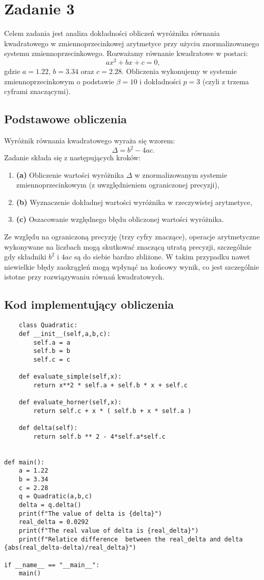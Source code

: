 \documentclass{article}
\begin{document}
\section{Zadanie 3}

Celem zadania jest analiza dokładności obliczeń wyróżnika równania kwadratowego w zmiennoprzecinkowej arytmetyce przy użyciu znormalizowanego systemu zmiennoprzecinkowego. Rozważamy równanie kwadratowe w postaci:
\[
ax^2 + bx + c = 0,
\]
gdzie \(a = 1.22\), \(b = 3.34\) oraz \(c = 2.28\). Obliczenia wykonujemy w systemie zmiennoprzecinkowym o podstawie \(\beta = 10\) i dokładności \(p = 3\) (czyli z trzema cyframi znaczącymi).

\subsection{Podstawowe obliczenia}

Wyróżnik równania kwadratowego wyraża się wzorem:
\[
\Delta = b^2 - 4ac.
\]
Zadanie składa się z następujących kroków:
\begin{enumerate}
    \item \textbf{(a)} Obliczenie wartości wyróżnika \(\Delta\) w znormalizowanym systemie zmiennoprzecinkowym (z uwzględnieniem ograniczonej precyzji),
    \item \textbf{(b)} Wyznaczenie dokładnej wartości wyróżnika w rzeczywistej arytmetyce,
    \item \textbf{(c)} Oszacowanie względnego błędu obliczonej wartości wyróżnika.
\end{enumerate}

Ze względu na ograniczoną precyzję (trzy cyfry znaczące), operacje arytmetyczne wykonywane na liczbach mogą skutkować znaczącą utratą precyzji, szczególnie gdy składniki \(b^2\) i \(4ac\) są do siebie bardzo zbliżone. W takim przypadku nawet niewielkie błędy zaokrągleń mogą wpłynąć na końcowy wynik, co jest szczególnie istotne przy rozwiązywaniu równań kwadratowych.

\subsection{Kod implementujący obliczenia}

\begin{verbatim}
    class Quadratic:
    def __init__(self,a,b,c):
        self.a = a
        self.b = b
        self.c = c

    def evaluate_simple(self,x):
        return x**2 * self.a + self.b * x + self.c
    
    def evaluate_horner(self,x):
        return self.c + x * ( self.b + x * self.a ) 
    
    def delta(self):
        return self.b ** 2 - 4*self.a*self.c
    

def main():
    a = 1.22
    b = 3.34
    c = 2.28
    q = Quadratic(a,b,c)
    delta = q.delta()
    print(f"The value of delta is {delta}")
    real_delta = 0.0292
    print(f"The real value of delta is {real_delta}")
    print(f"Relatice difference  between the real_delta and delta {abs(real_delta-delta)/real_delta}")

if __name__ == "__main__":
    main()
\end{verbatim}
\end{document}
